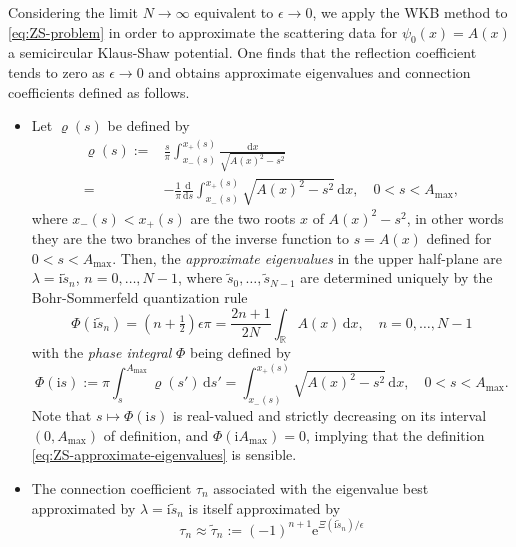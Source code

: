 \documentclass[12pt]{amsart}
\numberwithin{equation}{section}
\newcommand{\dd}{\mathrm{d}}
\newcommand{\ee}{\mathrm{e}}
\newcommand{\ii}{\mathrm{i}}
\newcommand{\SP}{\lambda}
\newcommand{\phaseint}{\Phi}
\newcommand{\tailint}{\Xi}
\newcommand{\evdensity}{\varrho}
\def\eq{\begin{equation}}
\def\endeq{\end{equation}}
\begin{document}
Considering the limit $N\to\infty$ equivalent to $\epsilon\to 0$, we apply the WKB method to \eqref{eq:ZS-problem} in order to approximate the scattering data for $\psi_0(x)=A(x)$ a semicircular Klaus-Shaw potential.  One finds that the reflection coefficient tends to zero as $\epsilon\to 0$ and obtains 
approximate eigenvalues and connection coefficients defined as follows.  
\begin{itemize}
\item Let $\evdensity(s)$ be defined by 
\eq
\begin{split}
\evdensity(s):=&\frac{s}{\pi}\int_{x_-(s)}^{x_+(s)}\frac{\dd x}{\sqrt{A(x)^2-s^2}}\\
  =&-\frac{1}{\pi}\frac{\dd}{\dd s}
\int_{x_-(s)}^{x_+(s)}\sqrt{A(x)^2-s^2}\,\dd x,\quad 0<s<A_\mathrm{max},
\label{eq:ZS-density}
\end{split}
\endeq
where $x_-(s)<x_+(s)$ are the two roots $x$ of $A(x)^2-s^2$, in other words they are the two branches of the inverse function to $s=A(x)$ defined for $0<s<A_\mathrm{max}$.
Then, the \emph{approximate eigenvalues} in the upper half-plane are $\SP=\ii\widetilde{s}_{n}$, $n=0,\dots,N-1$, where $\widetilde{s}_{0},\dots,\widetilde{s}_{N-1}$ are determined uniquely by the Bohr-Sommerfeld quantization rule
\begin{equation}
\phaseint(\ii\widetilde{s}_{n}) = (n+\tfrac{1}{2})\epsilon\pi = \frac{2n+1}{2N}\int_\mathbb{R}A(x)\,\dd x,\quad n=0,\dots,N-1
\label{eq:ZS-approximate-eigenvalues}
\end{equation}
with the \emph{phase integral} $\phaseint$ being defined by
\begin{equation}
\phaseint(\ii s):=\pi\int_{s}^{A_\mathrm{max}}\evdensity(s')\,\dd s'= \int_{x_-(s)}^{x_+(s)}\sqrt{A(x)^2-s^2}\,\dd x,\quad 0<s<A_\mathrm{max}.
\label{eq:ZS-phase-integral}
\end{equation}
Note that $s\mapsto\phaseint(\ii s)$ is real-valued and strictly decreasing on its interval $(0,A_\mathrm{max})$ of definition, and $\phaseint(\ii A_\mathrm{max})=0$, implying that the definition \eqref{eq:ZS-approximate-eigenvalues} is sensible.
\item The connection coefficient $\tau_n$ associated with the eigenvalue best approximated by $\SP=\ii\widetilde{s}_{n}$ is itself approximated by 
\begin{equation}
\tau_n\approx\widetilde{\tau}_{n} :=  (-1)^{n+1} \ee^{\tailint(\ii\widetilde{s}_{n})/\epsilon} 
\label{eq:ZS-proportionality-constant-no-interpolant}
\end{equation}

\end{itemize}
\end{document}

